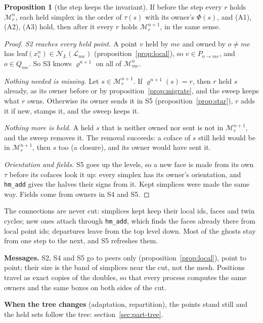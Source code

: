 \documentclass[10pt,a4paper]{article}
\theoremstyle{definition}
\newtheorem{proposition}{Proposition}
\newcommand{\fn}[1]{\texttt{#1}}
\begin{document}
\begin{proposition}[the step keeps the invariant]
  \label{prop:step}
  If before the step every $r$ holds $\mathcal{M}^n_r$, each held simplex
  in the order of $\tau(s)$ with its owner's $\Phi(s)$, and (A1), (A2),
  (A3) hold, then after it every $r$ holds $\mathcal{M}^{n+1}_r$, in the same
  sense.
\end{proposition}
\begin{proof}
  \emph{S2 reaches every held point.} A point $v$ held by $me$ and owned by
  $o \ne me$ has $\mathrm{leaf}(x^n_v) \in \mathcal{N}_L(\mathcal{L}_{me})$
  (proposition~\ref{prop:local}), so $v \in P_{o \to me}$, and $o \in
  Q_{me}$. So S3 knows $\varrho^{n+1}$ on all of $\mathcal{M}^n_{me}$.

  \emph{Nothing needed is missing.} Let $s \in \mathcal{M}^{n+1}_r$. If
  $\varrho^{n+1}(s) = r$, then $r$ held $s$ already, as its owner before or
  by proposition~\ref{prop:migrate}, and the sweep keeps what $r$ owns.
  Otherwise its owner sends it in S5 (proposition~\ref{prop:star}), $r$
  adds it if new, stamps it, and the sweep keeps it.

  \emph{Nothing more is held.} A held $s$ that is neither owned nor sent
  is not in $\mathcal{M}^{n+1}_r$, and the sweep removes it. The removal
  succeeds: a coface of $s$ still held would be in $\mathcal{M}^{n+1}_r$,
  then $s$ too (a closure), and its owner would have sent it.

  \emph{Orientation and fields.} S5 goes up the levels, so a new face is
  made from its own $\tau$ before its cofaces look it up: every simplex has
  its owner's orientation, and \fn{hm\_add} gives the halves their signs
  from it. Kept simplices were made the same way. Fields come from owners
  in S4 and S5.
\end{proof}

The connections are never cut: simplices kept keep their local ids, faces
and twin cycles; new ones attach through \fn{hm\_add}, which finds the
faces already there from local point ids; departures leave from the top
level down. Most of the ghosts stay from one step to the next, and S5
refreshes them.

\textbf{Messages.} S2, S4 and S5 go to peers only
(proposition~\ref{prop:local}), point to point; their size is the band of
simplices near the cut, not the mesh. Positions travel as exact copies of
the doubles, so that every process computes the same owners and the same
boxes on both sides of the cut.

\textbf{When the tree changes} (adaptation, repartition), the points stand
still and the held sets follow the tree: section~\ref{sec:part-tree}.
\end{document}
